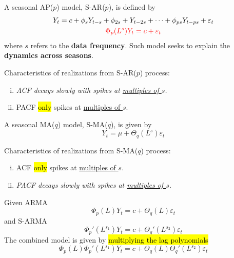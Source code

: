 \documentclass[11pt]{article}
\begin{document}
				\begin{definition}
					A seasonal AP($p$) model, S-AR($p$), is defined by
					\begin{gather}
						Y_t = c + \phi_s Y_{t-s} + \phi_{2s} + Y_{t-2s} + \dots + \phi_{ps} Y_{t - ps} + \varepsilon_t \\
						\textcolor{red}{\Phi_{p}(L^s) Y_t = c + \varepsilon_t}
					\end{gather}
					where $s$ refers to the \textbf{data frequency}. Such model seeks to explain the \textbf{dynamics across seasons}.
				\end{definition}
				
				\begin{definition}
					Characteristics of realizations from S-AR($p$) process:
					\begin{enumerate}[(i)]
						\item \emph{ACF decays slowly with spikes at \ul{multiples of $s$}.}
						\item PACF \hl{only} spikes at \ul{multiples of $s$}.
					\end{enumerate}
				\end{definition}
				
				\begin{definition}
					A seasonal MA($q$) model, S-MA($q$), is given by
					\begin{equation}
						Y_t = \mu + \Theta_q(L^s) \varepsilon_t
					\end{equation}
				\end{definition}
				
				\begin{remark}
					Characteristics of realizations from S-MA($q$) process:
					\begin{enumerate}[(i)]
						\item ACF \hl{only} spikes at \ul{multiples of $s$}.
						\item \emph{PACF decays slowly with spikes at \ul{multiples of $s$}.}
					\end{enumerate}
				\end{remark}
				
				\begin{proposition}
					Given ARMA 
					\begin{equation}
						\Phi_p(L) Y_t = c + \Theta_q(L) \varepsilon_t
					\end{equation}
					and S-ARMA
					\begin{equation}
						\Phi_p'(L^{s_1}) Y_t = c + \Theta_q'(L^{s_2}) \varepsilon_t
					\end{equation}
					The combined model is given by \hl{multiplying the lag polynomials}
					\begin{equation}
						\Phi_p(L) \Phi_p'(L^{s_1}) Y_t = c +  \Theta_q(L) \Theta_q'(L^{s_2}) \varepsilon_t
					\end{equation}
				\end{proposition}
\end{document}
